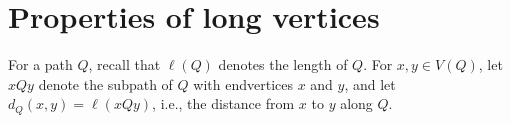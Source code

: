 \documentclass[12pt]{amsart}
\theoremstyle{plain}
\newtheorem{lem}[thm]{Lemma}
\newtheorem{cor}[thm]{Corollary}
\theoremstyle{definition}
\theoremstyle{remark}
\newcommand{\fancy}[1]{\mathcal{#1}}
\newcommand{\W}{\fancy{W}}
\newcommand{\set}[1]{\left\{ #1 \right\}}
\begin{document}


\section{Properties of long vertices}
For a path $Q$, recall that $\ell(Q)$ denotes the length of $Q$.
For $x,y \in V(Q)$, let $xQy$ denote the subpath of $Q$ with
endvertices $x$ and $y$, and let $d_Q(x,y) = \ell(xQy)$, i.e., the distance
from $x$ to $y$ along $Q$.
\end{document}

